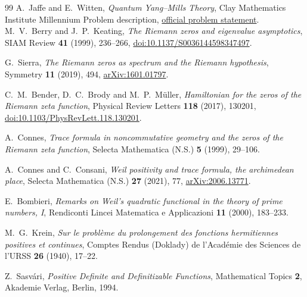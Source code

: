 \begin{thebibliography}{99}
A.~Jaffe and E.~Witten, \emph{Quantum Yang--Mills Theory},
Clay Mathematics Institute Millennium Problem description,
\href{https://www.claymath.org/wp-content/uploads/2022/06/yangmills.pdf}{official problem statement}.
M.~V.~Berry and J.~P.~Keating, \emph{The Riemann zeros and eigenvalue
asymptotics}, SIAM Review \textbf{41} (1999), 236--266,
\href{https://doi.org/10.1137/S0036144598347497}{doi:10.1137/S0036144598347497}.

G.~Sierra, \emph{The Riemann zeros as spectrum and the Riemann hypothesis},
Symmetry \textbf{11} (2019), 494,
\href{https://arxiv.org/abs/1601.01797}{arXiv:1601.01797}.

C.~M.~Bender, D.~C.~Brody and M.~P.~M\"uller, \emph{Hamiltonian for the zeros
of the Riemann zeta function}, Physical Review Letters \textbf{118} (2017),
130201,
\href{https://doi.org/10.1103/PhysRevLett.118.130201}{doi:10.1103/PhysRevLett.118.130201}.

A.~Connes, \emph{Trace formula in noncommutative geometry and the zeros of
the Riemann zeta function}, Selecta Mathematica (N.S.) \textbf{5} (1999),
29--106.

A.~Connes and C.~Consani, \emph{Weil positivity and trace formula, the
archimedean place}, Selecta Mathematica (N.S.) \textbf{27} (2021), 77,
\href{https://arxiv.org/abs/2006.13771}{arXiv:2006.13771}.

E.~Bombieri, \emph{Remarks on Weil's quadratic functional in the theory of
prime numbers, I}, Rendiconti Lincei Matematica e Applicazioni \textbf{11}
(2000), 183--233.

M.~G.~Krein, \emph{Sur le probl\`eme du prolongement des fonctions
hermitiennes positives et continues}, Comptes Rendus (Doklady) de
l'Acad\'emie des Sciences de l'URSS \textbf{26} (1940), 17--22.

Z.~Sasv\'ari, \emph{Positive Definite and Definitizable Functions},
Mathematical Topics \textbf{2}, Akademie Verlag, Berlin, 1994.

\end{thebibliography}
